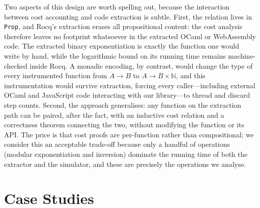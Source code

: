 \documentclass[sigconf,anonymous,review]{acmart}
\begin{document}
Two aspects of this design are worth spelling out, because the interaction between cost accounting and code extraction is subtle. First, the relation \texttt{} lives in \texttt{Prop}, and Rocq's extraction erases all propositional content: the cost analysis therefore leaves no footprint whatsoever in the extracted OCaml or WebAssembly code. The extracted binary exponentiation is exactly the function one would write by hand, while the logarithmic bound on its running time remains machine-checked inside Rocq. A monadic encoding, by contrast, would change the type of every instrumented function from $A \rightarrow B$ to $A \rightarrow B \times \mathbb{N}$, and this instrumentation would survive extraction, forcing every caller---including external OCaml and JavaScript code interacting with our library---to thread and discard step counts. Second, the approach generalises: any function on the extraction path can be paired, after the fact, with an inductive cost relation and a correctness theorem connecting the two, without modifying the function or its API. The price is that cost proofs are per-function rather than compositional; we consider this an acceptable trade-off because only a handful of operations (modular exponentiation and inversion) dominate the running time of both the extractor and the simulator, and these are precisely the operations we analyse.

\section{Case Studies}\label{case_studies}
\end{document}
